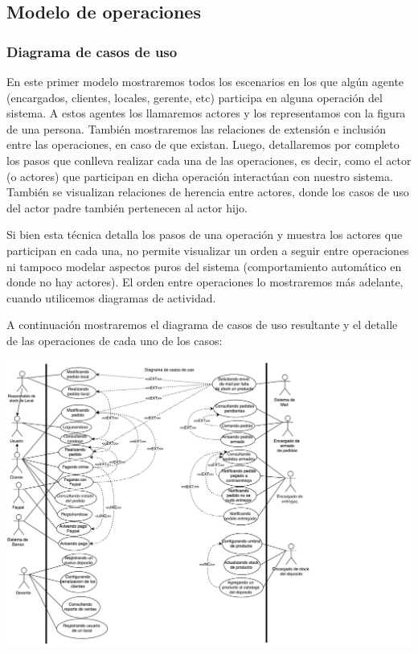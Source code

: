 \subsection{Modelo de operaciones}

\subsubsection{Diagrama de casos de uso}

En este primer modelo mostraremos todos los escenarios en los que algún agente (encargados, clientes, locales, gerente, etc) participa en alguna operación del sistema. A estos agentes los llamaremos actores y los representamos con la figura de una persona. También mostraremos las relaciones de extensión e inclusión entre las operaciones, en caso de que existan. Luego, detallaremos por completo los pasos que conlleva realizar cada una de las operaciones, es decir, como el actor (o actores) que participan en dicha operación interactúan con nuestro sistema. También se visualizan relaciones de herencia entre actores, donde los casos de uso del actor padre también pertenecen al actor hijo.

Si bien esta técnica detalla los pasos de una operación y muestra los actores que participan en cada una, no permite visualizar un orden a seguir entre operaciones ni tampoco modelar aspectos puros del sistema (comportamiento automático en donde no hay actores). El orden entre operaciones lo mostraremos más adelante, cuando utilicemos diagramas de actividad.

A continuación mostraremos el diagrama de casos de uso resultante y el detalle de las operaciones de cada uno de los casos:

\includegraphics[scale=0.5, angle=90]{secciones/diagramaCasosUso}

